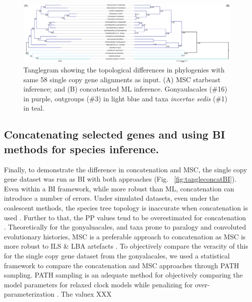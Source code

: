 \documentclass[12pt]{article}
\begin{document}
\begin{figure} 
\includegraphics[scale=.2]{figures/MSC-BI_vs_singlecopy-concat-ML.png} 
\caption{Tanglegram showing the topological differences in phylogenies with same 58 single copy gene alignments as input. (A) MSC starbeast inference; and (B) concatenated ML inference. Gonyaulacales (\#16) in purple, outgroups (\#3) in light blue and taxa \textit{incertae sedis} (\#1) in teal.} 
\label{fig:tangleconcatML}
\end{figure} 
\FloatBarrier

\subsection*{Concatenating selected genes and using BI methods for species inference.}
\FloatBarrier
Finally, to demonstrate the difference in concatenation and MSC, the single copy gene dataset was run as BI with both approaches (Fig. ~\ref{fig:tangleconcatBI}). 
Even within a BI framework, while more robust than ML, concatenation can introduce a number of errors. 
Under simulated datasets, even under the coalescent methods, the species tree topology is inaccurate when concatenation is used \cite{kubatko2007inconsistency}. 
Further to that, the PP values tend to be overestimated for concatenation \cite{suzuki2002overcredibility}. 
Theoretically for the gonyaluacales, and taxa prone to paralogy and convoluted evolutionary histories, MSC is a preferable approach to concatenation as MSC is more robust to ILS \& LBA artefacts \cite{liu2014coalescent}.
To objectively compare the veracity of this  for the single copy gene dataset from the gonyalacales, we used a statistical framework to compare the concatenation and MSC approaches through PATH sampling. 
PATH sampling is an adequate method for objectively comparing the model parameters for relaxed clock models while penalizing for over-parameterization \cite{baele2012accurate}. 
The valuex XXX %

  
\end{document}
